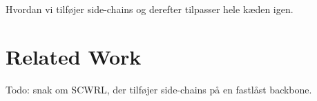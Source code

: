 Hvordan vi tilføjer side-chains og derefter tilpasser hele kæden igen.

\section{Related Work}
Todo: snak om SCWRL, der tilføjer side-chains på en fastlåst backbone.

